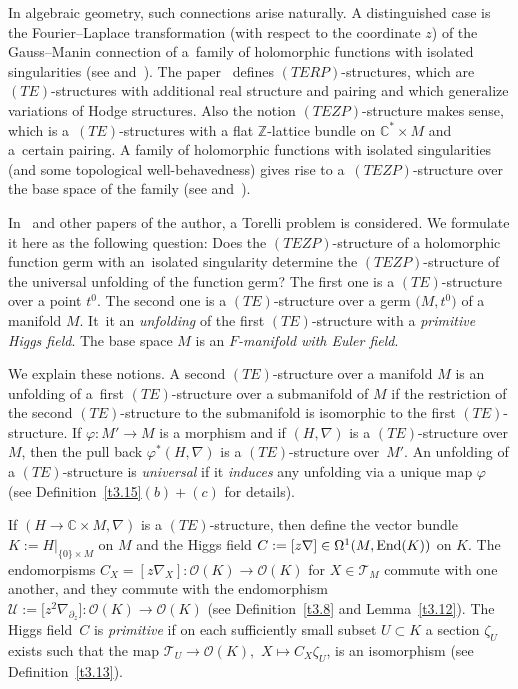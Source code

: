 \documentclass[10pt,a4paper]{amsart}
\numberwithin{equation}{section}
\numberwithin{figure}{section}
\newcommand{\Z}{{\mathbb Z}}
\newcommand{\C}{{\mathbb C}}
\newcommand{\OO}{{\mathcal O}}
\newcommand{\TT}{{\mathcal T}}
\newcommand{\UU}{{\mathcal U}}
\newcommand{\paa}{\partial}
\newcommand{\nnn}{\nabla}
\begin{document}
In algebraic geometry, such connections arise naturally.
A distinguished case is the Fourier--Laplace transformation
(with respect to the coordinate $z$)
of the Gauss--Manin connection of a~family of
holomorphic functions with isolated singularities
(see \cite[Chapter~8]{He03} and~\cite[Chapter~VII]{Sa02}). The paper~\cite{He03}
defines $(TERP)$-structures, which are $(TE)$-structures
with additional real structure and pairing
and which generalize variations of Hodge structures.
Also the notion $(TEZP)$-structure makes sense, which is a~$(TE)$-structures with a flat $\Z$-lattice bundle
on $\C^*\times M$ and a~certain pairing.
A family of holomorphic functions with isolated singularities
(and some topological well-behavedness) gives rise to a~$(TEZP)$-structure over the base space of the family
(see \cite[Chapter~11.4]{He02} and~\cite[Chapter~8]{He03}).

In~\cite{He02} and other papers of the author,
a Torelli problem is considered.
We formulate it here as the following question:
Does the $(TEZP)$-structure of a holomorphic function germ with
an~isolated singularity determine the $(TEZP)$-structure
of the universal unfolding of the function germ?
The first one is a $(TE)$-structure over a point $t^0$.
The second one is a $(TE)$-structure over a germ
$\big(M,t^0\big)$ of a manifold $M$. It~it an {\it unfolding}
of the first $(TE)$-structure with a {\it primitive
Higgs field}. The base space $M$ is an
{\it $F$-manifold with Euler field}.

We explain these notions. A second $(TE)$-structure over
a manifold $M$ is an unfolding of a~first $(TE)$-structure
over a submanifold of $M$ if the restriction of the second
$(TE)$-structure to the submanifold
is isomorphic to the first $(TE)$-structure.
If $\varphi\colon M'\to M$ is a morphism
and if $(H,\nnn)$ is a $(TE)$-structure over $M$,
then the pull back $\varphi^*(H,\nnn)$ is a $(TE)$-structure
over~$M'$. An unfolding of a $(TE)$-structure
is {\it universal} if it {\it induces}
any unfolding via a unique map $\varphi$
(see Definition~\ref{t3.15}$(b){+}(c)$ for details).

If $(H\to\C\times M,\nnn)$ is a $(TE)$-structure, then
define the vector bundle $K:=H|_{\{0\}\times M}$ on $M$
and the Higgs field
$C:=[z\nnn]\in \Omega^1(M,{\rm End}(K))$ on $K$.
The endomorpisms $C_X=[z\nnn_X]\colon \OO(K)\to\OO(K)$ for
$X\in \TT_M$ commute with one another,
and they commute with the
endomorphism $\UU:=\big[z^2\nnn_{\paa_z}\big]\colon \OO(K)\to\OO(K)$
(see Definition~\ref{t3.8} and Lemma~\ref{t3.12}).
The Higgs field~$C$ is {\it primitive} if on each sufficiently
small subset $U\subset K$ a section $\zeta_U$ exists such
that the map $\TT_U\to \OO(K),$ $X\mapsto C_X\zeta_U$, is
an isomorphism (see Definition~\ref{t3.13}).
\end{document}
